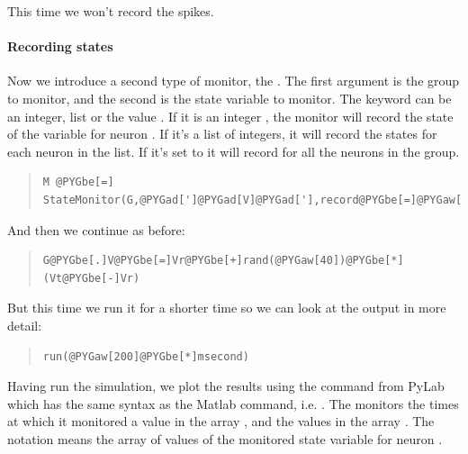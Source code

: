 \documentclass[letterpaper,10pt,english]{manual}
\begin{document}
This time we won't record the spikes.


\paragraph{Recording states}

Now we introduce a second type of monitor, the \hyperlink{brian.StateMonitor}{}.
The first argument is the group to monitor, and the second is
the state variable to monitor. The keyword  can be
an integer, list or the value . If it is an integer ,
the monitor will record the state of the variable for neuron .
If it's a list of integers, it will record the states for
each neuron in the list. If it's set to  it will record
for all the neurons in the group.
\begin{quote}

\begin{Verbatim}[commandchars=@\[\]]
M @PYGbe[=] StateMonitor(G,@PYGad[']@PYGad[V]@PYGad['],record@PYGbe[=]@PYGaw[0])
\end{Verbatim}
\end{quote}

And then we continue as before:
\begin{quote}

\begin{Verbatim}[commandchars=@\[\]]
G@PYGbe[.]V@PYGbe[=]Vr@PYGbe[+]rand(@PYGaw[40])@PYGbe[*](Vt@PYGbe[-]Vr)
\end{Verbatim}
\end{quote}

But this time we run it for a shorter time so we can look at
the output in more detail:
\begin{quote}

\begin{Verbatim}[commandchars=@\[\]]
run(@PYGaw[200]@PYGbe[*]msecond)
\end{Verbatim}
\end{quote}

Having run the simulation, we plot the results using the
 command from PyLab which has the same syntax as the Matlab
 command, i.e. . The \hyperlink{brian.StateMonitor}{}
monitors the times at which it monitored a value in the
array , and the values in the array . The notation
 means the array of values of the monitored state
variable for neuron .
\end{document}
